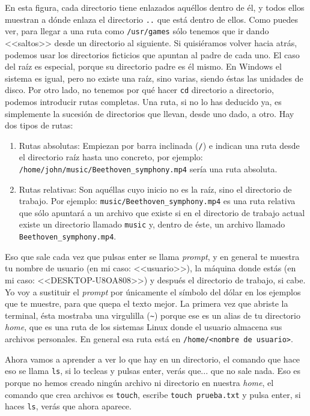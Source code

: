 \documentclass[a4paper]{article}
\begin{document}
En esta figura, cada directorio tiene enlazados aquéllos dentro de él, y todos
ellos muestran a dónde enlaza el directorio \verb!..! que está dentro de ellos.
Como puedes ver, para llegar a una ruta como \verb!/usr/games! sólo tenemos
que ir dando <<saltos>> desde un directorio al siguiente. Si quisiéramos
volver hacia atrás, podemos usar los directorios ficticios que apuntan al padre
de cada uno. El caso del raíz es especial, porque su directorio padre es él
mismo. En Windows el sistema es igual, pero no existe una raíz, sino varias,
siendo éstas las unidades de disco. Por otro lado, no tenemos por qué hacer
\verb!cd! directorio a directorio, podemos introducir rutas completas. Una ruta,
si no lo has deducido ya, es simplemente la sucesión de directorios que llevan,
desde uno dado, a otro. Hay dos tipos de rutas:
\begin{enumerate}
\item Rutas absolutas: Empiezan por barra inclinada (\verb!/!) e indican una
ruta desde el directorio raíz hasta uno concreto, por ejemplo:
\verb!/home/john/music/Beethoven_symphony.mp4! sería una ruta absoluta.
\item Rutas relativas: Son aquéllas cuyo inicio no es la raíz, sino el
directorio de trabajo. Por ejemplo: \verb!music/Beethoven_symphony.mp4! es una
ruta relativa que sólo apuntará a un archivo que existe
si en el directorio de trabajo actual existe
un directorio llamado \verb!music! y, dentro de éste, un archivo llamado
\verb!Beethoven_symphony.mp4!.
\end{enumerate}

Eso que sale cada vez que pulsas enter se llama \textit{prompt}, y en general
te muestra tu nombre de usuario (en mi caso: <<usuario>>), la máquina donde
estás (en mi caso: <<DESKTOP-U8OA808>>) y después el directorio de trabajo, si
cabe. Yo voy a sustituir el \textit{prompt} por únicamente
el símbolo del dólar en
los ejemplos que te muestre, para que quepa el texto mejor.
La primera vez que abriste la terminal, ésta mostraba una virgulilla (\verb!~!)
porque ese es un alias de tu
directorio \textit{home}, que es una ruta de los sistemas Linux donde el usuario
almacena sus archivos personales. En general esa ruta está en
\verb!/home/<nombre de usuario>!.

Ahora vamos a aprender a ver lo que hay en un directorio, el comando que hace
eso se llama \verb!ls!, si lo tecleas y pulsas enter, verás que... que no sale
nada. Eso es porque no hemos creado ningún archivo ni directorio en nuestra
\emph{home}, el comando que crea archivos es \verb!touch!, escribe
\verb!touch prueba.txt! y pulsa enter, si haces \verb!ls!, verás que ahora
aparece.
\end{document}
